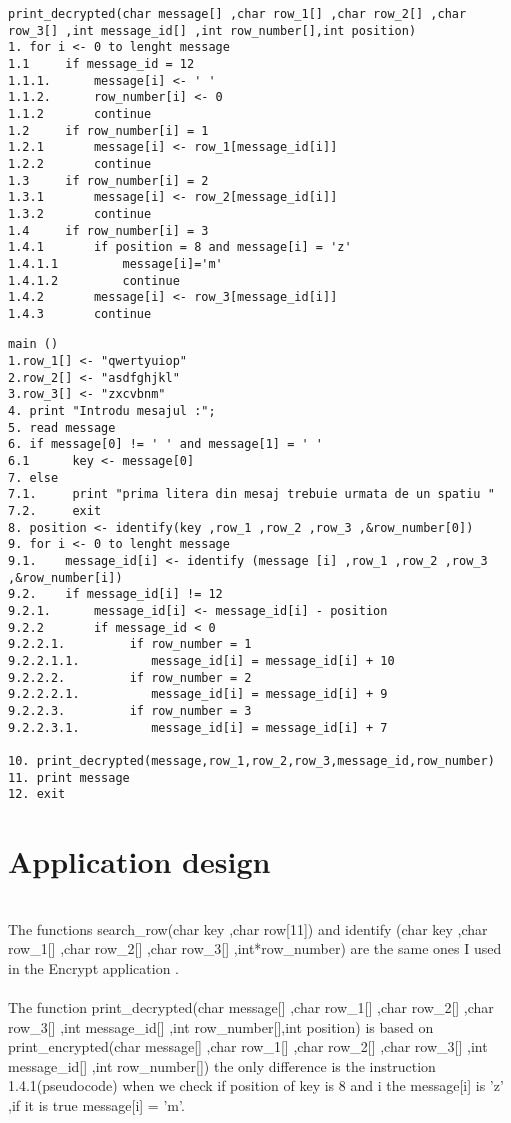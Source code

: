 \documentclass[14pt]{article}
\begin{document}
\begin{lstlisting}
print_decrypted(char message[] ,char row_1[] ,char row_2[] ,char row_3[] ,int message_id[] ,int row_number[],int position)
1. for i <- 0 to lenght message
1.1     if message_id = 12
1.1.1.      message[i] <- ' '
1.1.2.      row_number[i] <- 0
1.1.2       continue
1.2     if row_number[i] = 1
1.2.1       message[i] <- row_1[message_id[i]]
1.2.2       continue
1.3     if row_number[i] = 2
1.3.1       message[i] <- row_2[message_id[i]]
1.3.2       continue
1.4     if row_number[i] = 3
1.4.1       if position = 8 and message[i] = 'z'
1.4.1.1         message[i]='m'
1.4.1.2         continue
1.4.2       message[i] <- row_3[message_id[i]]
1.4.3       continue

\end{lstlisting}
\begin{lstlisting}
main ()
1.row_1[] <- "qwertyuiop"
2.row_2[] <- "asdfghjkl"
3.row_3[] <- "zxcvbnm"
4. print "Introdu mesajul :";
5. read message
6. if message[0] != ' ' and message[1] = ' '
6.1      key <- message[0]
7. else
7.1.     print "prima litera din mesaj trebuie urmata de un spatiu "
7.2.     exit
8. position <- identify(key ,row_1 ,row_2 ,row_3 ,&row_number[0])
9. for i <- 0 to lenght message
9.1.    message_id[i] <- identify (message [i] ,row_1 ,row_2 ,row_3 ,&row_number[i])
9.2.    if message_id[i] != 12
9.2.1.      message_id[i] <- message_id[i] - position
9.2.2       if message_id < 0
9.2.2.1.         if row_number = 1
9.2.2.1.1.          message_id[i] = message_id[i] + 10
9.2.2.2.         if row_number = 2
9.2.2.2.1.          message_id[i] = message_id[i] + 9
9.2.2.3.         if row_number = 3
9.2.2.3.1.          message_id[i] = message_id[i] + 7

10. print_decrypted(message,row_1,row_2,row_3,message_id,row_number)
11. print message
12. exit
\end{lstlisting}


\newpage
\section*{Application design}
\vspace{10 mm}

\\ The functions search\_row(char key ,char row[11])  and identify (char key ,char row\_1[] ,char row\_2[] ,char row\_3[] ,int*row\_number) are the same ones I used in the Encrypt application .\\
 
\\The function print\_decrypted(char message[] ,char row\_1[] ,char row\_2[] ,char row\_3[] ,int message\_id[] ,int row\_number[],int position) is based on print\_encrypted(char message[] ,char row\_1[] ,char row\_2[] ,char row\_3[] ,int message\_id[] ,int row\_number[]) the only difference is the instruction 1.4.1(pseudocode) when we check if position of key is 8 and i the message[i] is 'z' ,if it is true message[i] = 'm'.\\
\end{document}
